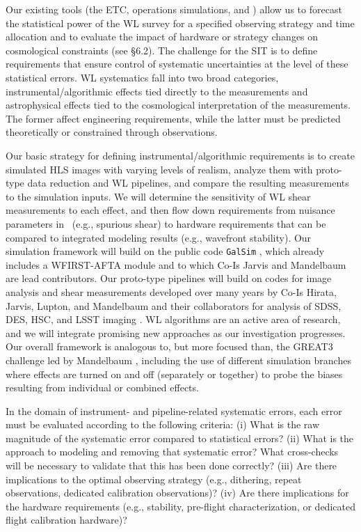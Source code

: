 Our existing tools (the ETC, operations simulations, and \CoLi)
allow us to forecast the statistical power of the WL survey for a specified
observing strategy and time allocation and to evaluate the impact of
hardware or strategy changes on cosmological constraints (see \S 6.2).
The challenge for the SIT is to define requirements that ensure control
of systematic uncertainties at the level of these statistical errors.
WL systematics fall into two broad categories, instrumental/algorithmic
effects tied directly to the measurements and astrophysical effects
tied to the cosmological interpretation of the measurements.  The former
affect engineering requirements, while the latter must be predicted
theoretically or constrained through observations.

Our basic strategy for defining instrumental/algorithmic requirements
is to create simulated HLS images with varying levels of realism, analyze
them with proto-type data reduction and WL pipelines, and compare the
resulting measurements to the simulation inputs. We will determine
the sensitivity of WL shear measurements to each effect,
and then flow down requirements from nuisance parameters in
\CoLi\ (e.g., spurious shear) to hardware requirements that can be compared to integrated
modeling results (e.g., wavefront stability).
Our simulation
framework will build on the public code {\tt GalSim} \cite{2015A&C....10..121R}, which already
includes a WFIRST-AFTA module and
to which Co-Is Jarvis and Mandelbaum are lead contributors.  Our proto-type pipelines will
build on codes for image analysis and shear measurements developed
over many years by Co-Is Hirata, Jarvis, Lupton, and Mandelbaum
and their collaborators for analysis of SDSS, DES, HSC, and LSST imaging
\cite{Lupton2001, 2003MNRAS.343..459H, 2005MNRAS.361.1287M,
2012MNRAS.420.1518M, 2011arXiv1111.6958H, Jarvis2015}.
WL algorithms are an active area of research,
and we will integrate promising new approaches as our investigation
progresses.  Our overall framework is analogous to, but more %
focused than, the GREAT3 challenge led by Mandelbaum \cite{2014ApJS..212....5M},
including the use of different simulation branches where effects are turned on and off
(separately or together) to probe the %
biases %
resulting from individual or combined effects.

In the domain of instrument- and pipeline-related systematic errors,
each error must be evaluated according to the following criteria:
(i) What is the raw magnitude of the systematic error compared to statistical errors?
(ii) What is the approach to modeling and removing that systematic error? What cross-checks will be necessary to
validate that this has been done correctly? (iii) Are there
implications to the optimal observing strategy (e.g., dithering, repeat observations, dedicated calibration
observations)? (iv) Are there implications for the hardware requirements (e.g.,
stability, pre-flight characterization, or dedicated flight calibration hardware)?

